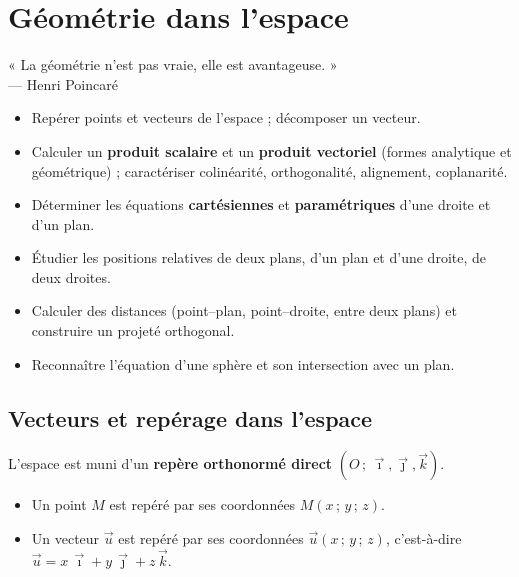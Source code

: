 \chapter{Géométrie dans l'espace}

\begin{citationchapitre}
	« La géométrie n'est pas vraie, elle est avantageuse. »\\[0.4em]
	— Henri Poincaré
\end{citationchapitre}

\begin{objectifs}
	\begin{itemize}[label=\textbullet]
		\item Repérer points et vecteurs de l'espace ; décomposer un vecteur.
		\item Calculer un \textbf{produit scalaire} et un \textbf{produit
		vectoriel} (formes analytique et géométrique) ; caractériser
		colinéarité, orthogonalité, alignement, coplanarité.
		\item Déterminer les équations \textbf{cartésiennes} et
		\textbf{paramétriques} d'une droite et d'un plan.
		\item Étudier les positions relatives de deux plans, d'un plan et d'une
		droite, de deux droites.
		\item Calculer des distances (point–plan, point–droite, entre deux
		plans) et construire un projeté orthogonal.
		\item Reconnaître l'équation d'une sphère et son intersection avec un plan.
	\end{itemize}
\end{objectifs}


\section{Vecteurs et repérage dans l'espace}

\begin{definition}
	L'espace est muni d'un \textbf{repère orthonormé direct}
	$(O\,;\,\vec\imath,\vec\jmath,\vec k)$.
	\begin{itemize}[label=\textbullet]
		\item Un point $M$ est repéré par ses coordonnées $M(x\,;\,y\,;\,z)$.
		\item Un vecteur $\vec u$ est repéré par ses coordonnées $\vec u(x\,;\,y\,;\,z)$,
		c'est-à-dire $\vec u = x\,\vec\imath + y\,\vec\jmath + z\,\vec k$.
	\end{itemize}
\end{definition}

